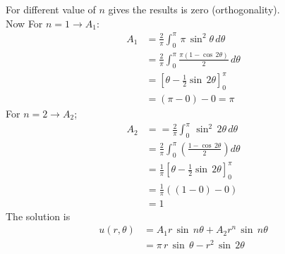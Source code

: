 For different value of $n$ gives the results is zero (orthogonality).\\
Now For $n=1\to A_1$:
\begin{align*}
A_1&=\frac{2}{\pi}\int_0^\pi\,\pi\,\sin^2\theta\,d\theta\\
&=\frac{2}{\pi}\int_0^\pi\frac{\pi(1-\cos\,2\theta)}{2}\,d\theta\\
&=[\theta-\frac{1}{2}\sin\,2\theta]_0^\pi\\
&=(\pi-0)-0=\pi
\end{align*}
For $n=2\to A_2$;
\begin{align*}
A_2&==\frac{2}{\pi}\int_0^\pi\,\sin^2\,2\theta\,d\theta\\
&=\frac{2}{\pi}\int_0^\pi\left(\frac{1-\cos\,2\theta}{2}\right)d\theta\\
&=\frac{1}{\pi}[\theta-\frac{1}{2}\sin\,2\theta]_0^\pi\\
&=\frac{1}{\pi}((1-0)-0)\\
&=1
\end{align*}
The solution is
\begin{align*}
u(r,\theta)&=A_1r\,\sin\,n\theta+A_2r^n\,\sin\,n\theta\\
&=\pi\,r\,\sin\,\theta-r^2\,\sin\,2\theta
\end{align*}
